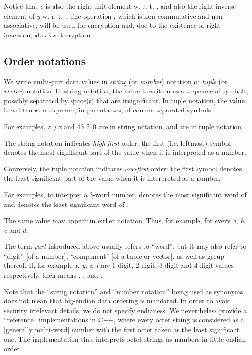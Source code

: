 \documentclass[a4paper,oneside,english]{amsart}
\numberwithin{equation}{section}
\numberwithin{figure}{section}
\begin{document}
Notice that \emph{e} is also the right unit element w. r. t. ,
and  also the right inverse element of \emph{y} w. r.
t. . The operation ,
which is non-commutative and non-associative, will be used for encryption
and, due to the existence of right inversion, also for decryption.


\subsection{Order notations}

We write multi-part data values in \emph{string} (or \emph{number})
notation or \emph{tuple} (or \emph{vector}) notation. In string notation,
the value is written as a sequence of symbols, possibly separated
by space(s) that are insignificant. In tuple notation, the value is
written as a sequence, in parentheses, of comma-separated symbols.

For examples, \emph{z y x} and 43 210 are in string notation, 
and  are in tuple notation.

The string notation indicates \emph{high-first} order: the first (i.e.
leftmost) symbol denotes the most significant part of the value when
it is interpreted as a number.

Conversely, the tuple notation indicates \emph{low-first} order: the
first symbol denotes the least significant part of the value when
it is interpreted as a number.

For examples, to interpret a 3-word number,  denotes the most
significant word of  and  denotes the least
significant word of .

The same value may appear in either notation. Thus, for example, for
every \emph{a}, \emph{b}, \emph{c} and \emph{d},




The term \emph{part} introduced above usually refers to {}``word'',
but it may also refer to {}``digit'' {[}of a number{]}, {}``component''
{[}of a tuple or vector{]}, as well as group thereof. If, for example
\emph{x}, \emph{y}, \emph{z}, \emph{t} are 1-digit, 2-digit, 3-digit
and 4-digit values respectively, then  means
, ,  and .

Note that the {}``string notation'' and {}``number notation''
being used as synonyms does not mean that big-endian data ordering
is mandated. In order to avoid security irrelevant details, we do
not specify endianess. We nevertheless provide a {}``reference''
implementations in C++, where every octet string is considered as
a {[}generally multi-word{]} number with the first octet taken as
the least significant one. The implementation thus interprets octet
strings as numbers in little-endian order.
\end{document}
